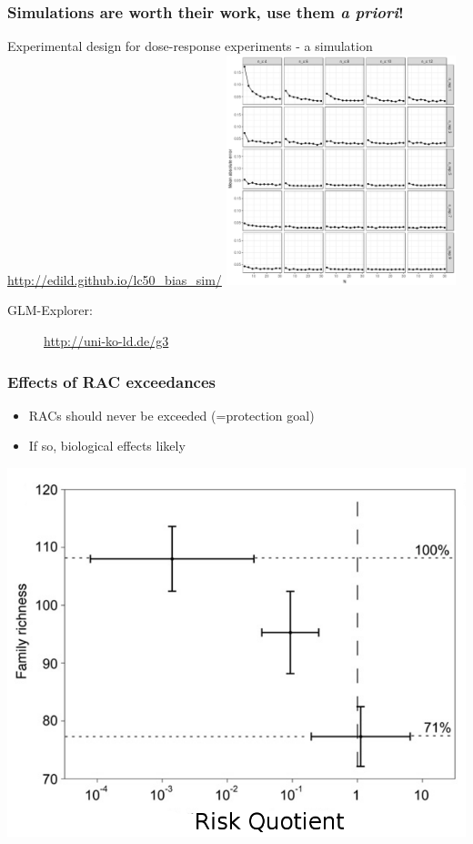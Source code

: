 \documentclass[
	12pt
	]{beamer}
\begin{document}
\begin{frame}
\frametitle{Simulations are worth their work, use them \emph{a priori}!}
\begingroup
\footnotesize %
	Experimental design for dose-response experiments - a simulation \\
	\url{http://edild.github.io/lc50_bias_sim/}
		    	\includegraphics[width=0.5\textwidth, keepaspectratio]{figs/sim_drm.png} \\
	\begin{description}
		\item[GLM-Explorer:]{\url{http://uni-ko-ld.de/g3}}
	\end{description}
\endgroup
\end{frame}


{%
\begin{frame}
\frametitle{Effects of RAC exceedances}
			\begin{itemize}
				\item RACs should never be exceeded (=protection goal)
				\item If so, biological effects likely
			\end{itemize}
	    	    	\includegraphics[height=0.7\textheight]{figs/stehle_pnas_2015_mod.png}
\end{frame}
}
\end{document}

